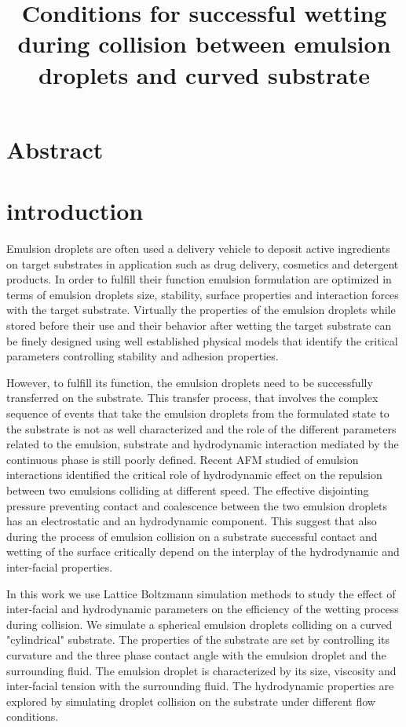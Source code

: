 \documentclass{article}
\title{Conditions for successful wetting during collision between emulsion droplets and curved substrate}
\begin{document}
\maketitle
\section{Abstract}
\section{introduction}
Emulsion droplets are often used a delivery vehicle to deposit active ingredients on target substrates in application such as drug delivery, cosmetics and detergent products. In order to fulfill their function emulsion formulation are optimized in terms of emulsion droplets size, stability, surface properties and interaction forces with the target substrate. Virtually the properties of the emulsion droplets while stored before their use and their behavior after wetting the target substrate can be finely designed using well established physical models that identify the critical parameters controlling stability and adhesion properties.

However, to fulfill its function, the emulsion droplets need to be successfully transferred on the substrate. This transfer process, that involves the complex sequence of events that take the emulsion droplets from the formulated state to the substrate is not as well characterized and the role of the different parameters related to the emulsion, substrate and hydrodynamic interaction mediated by the continuous phase is still poorly defined. Recent AFM studied of emulsion interactions identified the critical role of hydrodynamic effect on the repulsion between two emulsions colliding at different speed. The effective disjointing pressure preventing contact and coalescence between the two emulsion droplets has an electrostatic and an hydrodynamic component. This suggest that also during the process of emulsion collision on a substrate successful contact and wetting of the surface critically depend on the interplay of the hydrodynamic and inter-facial properties. 

In this work we use Lattice Boltzmann simulation methods to study the effect of inter-facial and hydrodynamic parameters on the efficiency of the wetting process during collision. We simulate a spherical emulsion droplets colliding on a curved "cylindrical" substrate. The properties of the substrate are set by controlling its curvature and the three phase contact angle with the emulsion droplet and the surrounding fluid. The emulsion droplet is characterized by its size, viscosity and inter-facial tension with the surrounding fluid. The hydrodynamic properties are explored by simulating droplet collision on the substrate under different flow conditions. 
\end{document}
